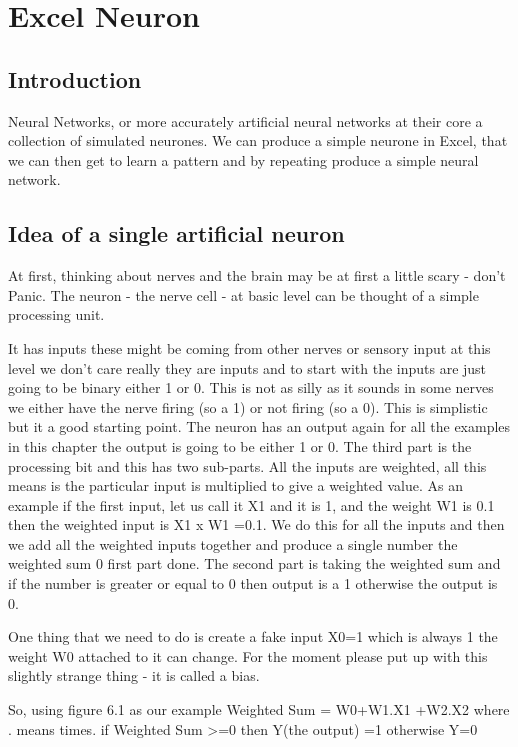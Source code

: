 \usepackage{booktabs}


\chapter{Excel Neuron}
\section{Introduction}
Neural Networks, or more accurately artificial neural networks at their core a collection of simulated neurones. We can produce a simple neurone in Excel, that we can then get to learn a pattern and by repeating produce a simple neural network.

\section{Idea of a single artificial neuron}
At first, thinking about nerves and the brain may be at first a little scary - don't Panic. The neuron - the nerve cell - at basic level can be thought of a simple processing unit.

It has inputs these might be coming from other nerves or sensory input at this level we don't care really they are inputs and to start with the inputs are just going to be binary either 1 or 0. This is not as silly as it sounds in some nerves we either have the nerve firing (so a 1) or not firing (so a 0). This is simplistic but it a good starting point.
The neuron has an output again for all the examples in this chapter the output is going to be either 1 or 0.
The third part is the processing bit and this has two sub-parts. All the inputs are weighted, all this means is the particular input is multiplied to give a weighted value. As an example if the first input, let us call it X1 and it is 1, and the weight W1 is 0.1 then the weighted input is X1 x W1 =0.1. We do this for all the inputs and then we add all the weighted inputs together and produce a single number the weighted sum 0 first part done. The second part is taking the weighted sum and if the number is greater or equal to 0 then output is a 1 otherwise the output is 0.

One thing that we need to do is create a fake input X0=1 which is always 1 the weight W0 attached to it can change. For the moment please put up with this slightly strange thing - it is called a bias.

So, using figure 6.1 as our example
Weighted Sum = W0+W1.X1 +W2.X2 where . means times.
if Weighted Sum >=0 then Y(the output) =1 otherwise Y=0

